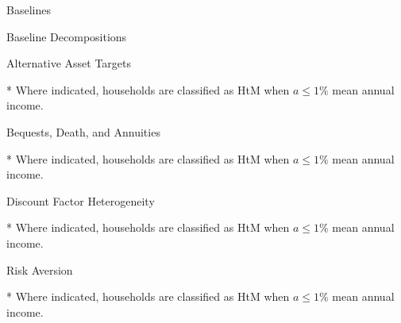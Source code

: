 \documentclass{article}
\begin{document}
\begin{table}
\centering
\caption{Baselines}

\end{table}

\begin{table}
\centering
\caption{Baseline Decompositions}

\end{table}

\clearpage

\begin{table}[h]
\caption{Alternative Asset Targets}
\begin{threeparttable}
\centering


\begin{tablenotes}
	\item[*] Where indicated, households are classified as HtM when $a \leq 1\%$ mean annual income.
\end{tablenotes}
\end{threeparttable}
\end{table}

\begin{table}[h]
\caption{Bequests, Death, and Annuities}
\begin{threeparttable}
\centering


\begin{tablenotes}
	\item[*] Where indicated, households are classified as HtM when $a \leq 1\%$ mean annual income.
\end{tablenotes}
\end{threeparttable}
\end{table}

\begin{table}[h]
\caption{Discount Factor Heterogeneity}
\begin{threeparttable}
\centering


\begin{tablenotes}
	\item[*] Where indicated, households are classified as HtM when $a \leq 1\%$ mean annual income.
\end{tablenotes}
\end{threeparttable}
\end{table}

\begin{table}[h]
\caption{Risk Aversion}
\begin{threeparttable}
\centering


\begin{tablenotes}
	\item[*] Where indicated, households are classified as HtM when $a \leq 1\%$ mean annual income.
\end{tablenotes}
\end{threeparttable}
\end{table}
\end{document}
